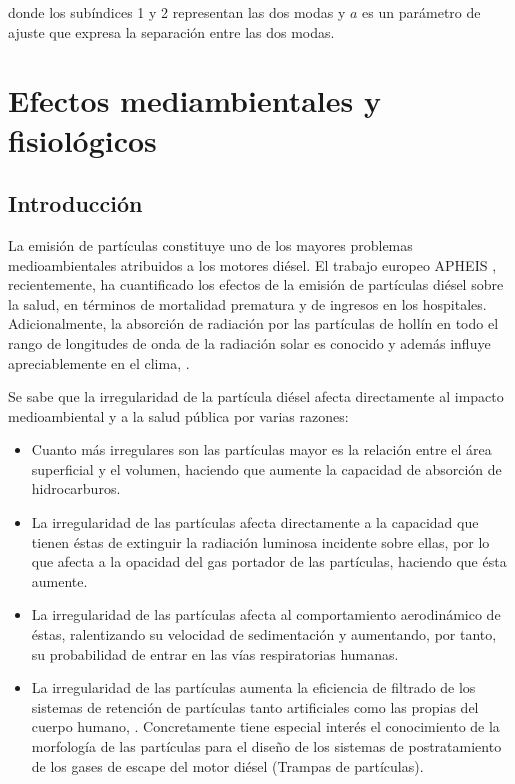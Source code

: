 donde los subíndices 1 y 2 representan las dos modas y $a$ es un parámetro de ajuste que expresa la separación entre las dos modas.

\section{Efectos mediambientales y fisiológicos}
\subsection{Introducción}
\par La emisión de partículas constituye uno de los mayores problemas medioambientales atribuidos a los motores diésel. El trabajo europeo APHEIS \cite{apheis:2004}, recientemente, ha cuantificado los efectos de la emisión de partículas diésel sobre la salud, en términos de mortalidad prematura y de ingresos en los hospitales. Adicionalmente, la absorción de radiación por las partículas de hollín en todo el rango de longitudes de onda de la radiación solar es conocido y además influye apreciablemente en el clima, \cite{sorensen:2001}.

\par Se sabe que la irregularidad de la partícula diésel afecta directamente al impacto medioambiental y a la salud pública por varias razones:
 
\begin{itemize}
\item Cuanto más irregulares son las partículas mayor es la relación entre el área superficial y el volumen, haciendo que aumente la capacidad de absorción de hidrocarburos. 

\item La irregularidad de las partículas afecta directamente a la capacidad que tienen éstas de extinguir la radiación luminosa incidente sobre ellas, por lo que afecta a la opacidad del gas portador de las partículas, haciendo que ésta aumente.

\item La irregularidad de las partículas afecta al comportamiento aerodinámico de éstas, ralentizando su velocidad de sedimentación y aumentando, por tanto, su probabilidad de entrar en las vías respiratorias humanas.

\item La irregularidad de las partículas aumenta la eficiencia de filtrado de los sistemas de retención de partículas tanto artificiales como las propias del cuerpo humano, \cite{bockhornetal:2002}. Concretamente tiene especial interés el conocimiento de la morfología de las partículas para el diseño de los sistemas de postratamiento de los gases de escape del motor diésel (Trampas de partículas).

\end{itemize}


